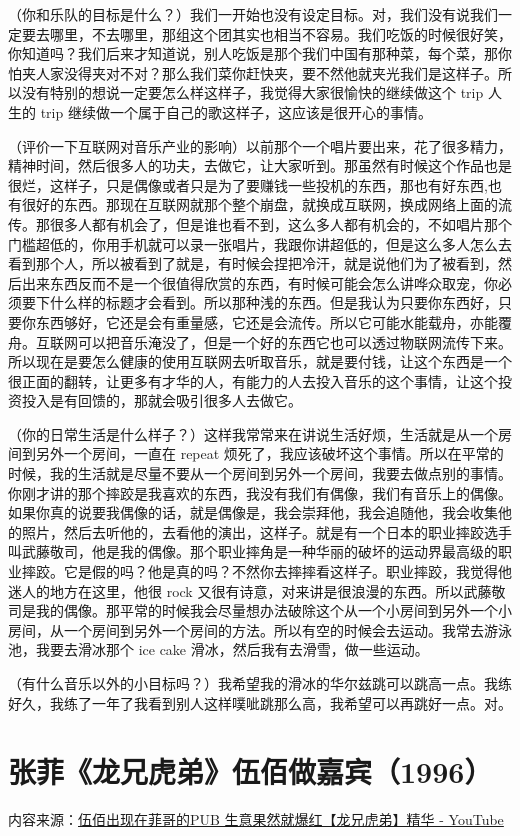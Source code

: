 \documentclass[UTF8,a4paper,oneside,twocolumn,12pt]{ctexbook}
\begin{document}
（你和乐队的目标是什么？）我们一开始也没有设定目标。对，我们没有说我们一定要去哪里，不去哪里，那组这个团其实也相当不容易。我们吃饭的时候很好笑，你知道吗？我们后来才知道说，别人吃饭是那个我们中国有那种菜，每个菜，那你怕夹人家没得夹对不对？那么我们菜你赶快夹，要不然他就夹光我们是这样子。所以没有特别的想说一定要怎么样这样子，我觉得大家很愉快的继续做这个 trip 人生的 trip 继续做一个属于自己的歌这样子，这应该是很开心的事情。

（评价一下互联网对音乐产业的影响）以前那个一个唱片要出来，花了很多精力，精神时间，然后很多人的功夫，去做它，让大家听到。那虽然有时候这个作品也是很烂，这样子，只是偶像或者只是为了要赚钱一些投机的东西，那也有好东西,也有很好的东西。那现在互联网就那个整个崩盘，就换成互联网，换成网络上面的流传。那很多人都有机会了，但是谁也看不到，这么多人都有机会的，不如唱片那个门槛超低的，你用手机就可以录一张唱片，我跟你讲超低的，但是这么多人怎么去看到那个人，所以被看到了就是，有时候会捏把冷汗，就是说他们为了被看到，然后出来东西反而不是一个很值得欣赏的东西，有时候可能会怎么讲哗众取宠，你必须要下什么样的标题才会看到。所以那种浅的东西。但是我认为只要你东西好，只要你东西够好，它还是会有重量感，它还是会流传。所以它可能水能载舟，亦能覆舟。互联网可以把音乐淹没了，但是一个好的东西它也可以透过物联网流传下来。所以现在是要怎么健康的使用互联网去听取音乐，就是要付钱，让这个东西是一个很正面的翻转，让更多有才华的人，有能力的人去投入音乐的这个事情，让这个投资投入是有回馈的，那就会吸引很多人去做它。

（你的日常生活是什么样子？）这样我常常来在讲说生活好烦，生活就是从一个房间到另外一个房间，一直在 repeat 烦死了，我应该破坏这个事情。所以在平常的时候，我的生活就是尽量不要从一个房间到另外一个房间，我要去做点别的事情。你刚才讲的那个摔跤是我喜欢的东西，我没有我们有偶像，我们有音乐上的偶像。如果你真的说要我偶像的话，就是偶像是，我会崇拜他，我会追随他，我会收集他的照片，然后去听他的，去看他的演出，这样子。就是有一个日本的职业摔跤选手叫武藤敬司，他是我的偶像。那个职业摔角是一种华丽的破坏的运动界最高级的职业摔跤。它是假的吗？他是真的吗？不然你去摔摔看这样子。职业摔跤，我觉得他迷人的地方在这里，他很 rock 又很有诗意，对来讲是很浪漫的东西。所以武藤敬司是我的偶像。那平常的时候我会尽量想办法破除这个从一个小房间到另外一个小房间，从一个房间到另外一个房间的方法。所以有空的时候会去运动。我常去游泳池，我要去滑冰那个 ice cake 滑冰，然后我有去滑雪，做一些运动。

（有什么音乐以外的小目标吗？）我希望我的滑冰的华尔兹跳可以跳高一点。我练好久，我练了一年了我看到别人这样噗呲跳那么高，我希望可以再跳好一点。对。

\section{张菲《龙兄虎弟》伍佰做嘉宾（1996）}
内容来源：\href{https://www.youtube.com/watch?v=i_j0UOQOj1Q}{伍佰出现在菲哥的PUB 生意果然就爆红【龙兄虎弟】精华 - YouTube}
\end{document}
